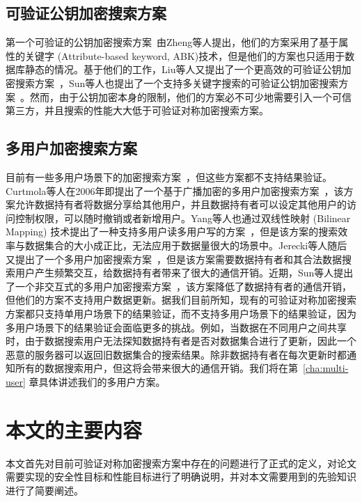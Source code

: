 \subsection{可验证公钥加密搜索方案}
第一个可验证的公钥加密搜索方案~\cite{zheng2014vabks}由Zheng等人提出，他们的方案采用了基于属性的关键字 (Attribute-based keyword, ABK)技术，但是他们的方案也只适用于数据库静态的情况。基于他们的工作，Liu等人又提出了一个更高效的可验证公钥加密搜索方案~\cite{liu2014efficient}，Sun等人也提出了一个支持多关键字搜索的可验证公钥加密搜索方案~\cite{sun2015catch}。然而，由于公钥加密本身的限制，他们的方案必不可少地需要引入一个可信第三方，并且搜索的性能大大低于可验证对称加密搜索方案。

\subsection{多用户加密搜索方案}
目前有一些多用户场景下的加密搜索方案~\cite{curtmola2011searchable,yang2009multiuser,jarecki2013outsourced,sun2016efficient}，但这些方案都不支持结果验证。Curtmola等人在2006年即提出了一个基于广播加密的多用户加密搜索方案~\cite{curtmola2011searchable}，该方案允许数据持有者将数据分享给其他用户，并且数据持有者可以设定其他用户的访问控制权限，可以随时撤销或者新增用户。Yang等人也通过双线性映射 (Bilinear Mapping) 技术提出了一种支持多用户读多用户写的方案~\cite{yang2009multiuser}，但是该方案的搜索效率与数据集合的大小成正比，无法应用于数据量很大的场景中。Jerecki等人随后又提出了一个多用户加密搜索方案~\cite{jarecki2013outsourced}，但是该方案需要数据持有者和其合法数据搜索用户产生频繁交互，给数据持有者带来了很大的通信开销。近期，Sun等人提出了一个非交互式的多用户加密搜索方案~\cite{sun2016efficient}，该方案降低了数据持有者的通信开销，但他们的方案不支持用户数据更新。据我们目前所知，现有的可验证对称加密搜索方案都只支持单用户场景下的结果验证，而不支持多用户场景下的结果验证，因为多用户场景下的结果验证会面临更多的挑战。例如，当数据在不同用户之间共享时，由于数据搜索用户无法探知数据持有者是否对数据集合进行了更新，因此一个恶意的服务器可以返回旧数据集合的搜索结果。除非数据持有者在每次更新时都通知所有的数据搜索用户，但这将会带来很大的通信开销。我们将在第~\ref{cha:multi-user} 章具体讲述我们的多用户方案。


\section{本文的主要内容}
本文首先对目前可验证对称加密搜索方案中存在的问题进行了正式的定义，对论文需要实现的安全性目标和性能目标进行了明确说明，并对本文需要用到的先验知识进行了简要阐述。

